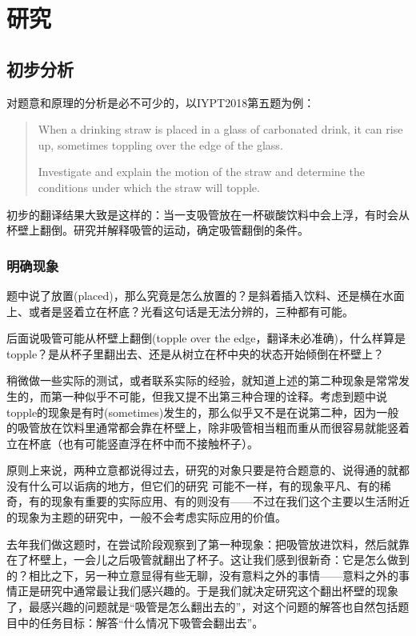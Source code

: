 \documentclass[a4paper,10pt,english]{sphinxmanual}
\begin{document}
\chapter{研究}
\label{\detokenize{6. Research:id1}}\label{\detokenize{6. Research::doc}}

\section{初步分析}
\label{\detokenize{6. Research:id2}}
对题意和原理的分析是必不可少的，以IYPT2018第五题为例：
\begin{quote}

When a drinking straw is placed in a glass of carbonated drink, it can rise up, sometimes toppling over the edge of the glass.

Investigate and explain the motion of the straw and determine the conditions under which the straw will topple.
\end{quote}

初步的翻译结果大致是这样的：当一支吸管放在一杯碳酸饮料中会上浮，有时会从杯壁上翻倒。研究并解释吸管的运动，确定吸管翻倒的条件。


\subsection{明确现象}
\label{\detokenize{6. Research:id3}}
题中说了放置(placed)，那么究竟是怎么放置的？是斜着插入饮料、还是横在水面上、或者是竖着立在杯底？光看这句话是无法分辨的，三种都有可能。

后面说吸管可能从杯壁上翻倒(topple over the edge，翻译未必准确)，什么样算是topple？是从杯子里翻出去、还是从树立在杯中央的状态开始倾倒在杯壁上？

稍微做一些实际的测试，或者联系实际的经验，就知道上述的第二种现象是常常发生的，而第一种似乎不可能，但我又提不出第三种合理的诠释。考虑到题中说topple的现象是有时(sometimes)发生的，那么似乎又不是在说第二种，因为一般的吸管放在饮料里通常都会靠在杯壁上，除非吸管相当粗而重从而很容易就能竖着立在杯底（也有可能竖直浮在杯中而不接触杯子）。

原则上来说，两种立意都说得过去，研究的对象只要是符合题意的、说得通的就都没有什么可以诟病的地方，但它们的研究  可能不一样，有的现象平凡、有的稀奇，有的现象有重要的实际应用、有的则没有——不过在我们这个主要以生活附近的现象为主题的研究中，一般不会考虑实际应用的价值。

去年我们做这题时，在尝试阶段观察到了第一种现象：把吸管放进饮料，然后就靠在了杯壁上，一会儿之后吸管就翻出了杯子。这让我们感到很新奇：它是怎么做到的？相比之下，另一种立意显得有些无聊，没有意料之外的事情——意料之外的事情正是研究中通常最让我们感兴趣的。于是我们就决定研究这个翻出杯壁的现象了，最感兴趣的问题就是“吸管是怎么翻出去的”，对这个问题的解答也自然包括题目中的任务目标：解答“什么情况下吸管会翻出去”。
\end{document}
